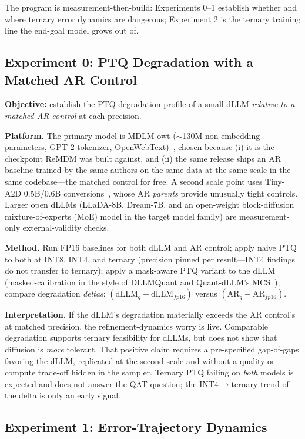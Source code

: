 \documentclass[11pt]{article}
\begin{document}
The program is measurement-then-build: Experiments 0--1 establish whether and where ternary error dynamics are dangerous; Experiment 2 is the ternary training line the end-goal model grows out of.

\subsection{Experiment 0: PTQ Degradation with a Matched AR Control}
\label{sec:exp0}

\textbf{Objective:} establish the PTQ degradation profile of a small dLLM \emph{relative to a matched AR control} at each precision.

\textbf{Platform.} The primary model is MDLM-owt ($\sim$130M non-embedding parameters, GPT-2 tokenizer, OpenWebText)~\cite{mdlmcode}, chosen because (i) it is the checkpoint ReMDM was built against, and (ii) the same release ships an AR baseline trained by the same authors on the same data at the same scale in the same codebase---the matched control for free. A second scale point uses Tiny-A2D 0.5B/0.6B conversions~\cite{dllmframework}, whose AR \emph{parents} provide unusually tight controls. Larger open dLLMs (LLaDA-8B, Dream-7B, and an open-weight block-diffusion mixture-of-experts (MoE) model in the target model family) are measurement-only external-validity checks.

\textbf{Method.} Run FP16 baselines for both dLLM and AR control; apply naive PTQ to both at INT8, INT4, and ternary (precision pinned per result---INT4 findings do not transfer to ternary); apply a mask-aware PTQ variant to the dLLM (masked-calibration in the style of DLLMQuant and Quant-dLLM's MCS~\cite{quantdllm}); compare degradation \emph{deltas}: $(\text{dLLM}_{q} - \text{dLLM}_{fp16})$ versus $(\text{AR}_{q} - \text{AR}_{fp16})$.

\textbf{Interpretation.} If the dLLM's degradation materially exceeds the AR control's at matched precision, the refinement-dynamics worry is live. Comparable degradation supports ternary feasibility for dLLMs, but does not show that diffusion is \emph{more} tolerant. That positive claim requires a pre-specified gap-of-gaps favoring the dLLM, replicated at the second scale and without a quality or compute trade-off hidden in the sampler. Ternary PTQ failing on \emph{both} models is expected and does not answer the QAT question; the INT4$\to$ternary trend of the delta is only an early signal.

\subsection{Experiment 1: Error-Trajectory Dynamics}
\label{sec:exp1}
\end{document}
